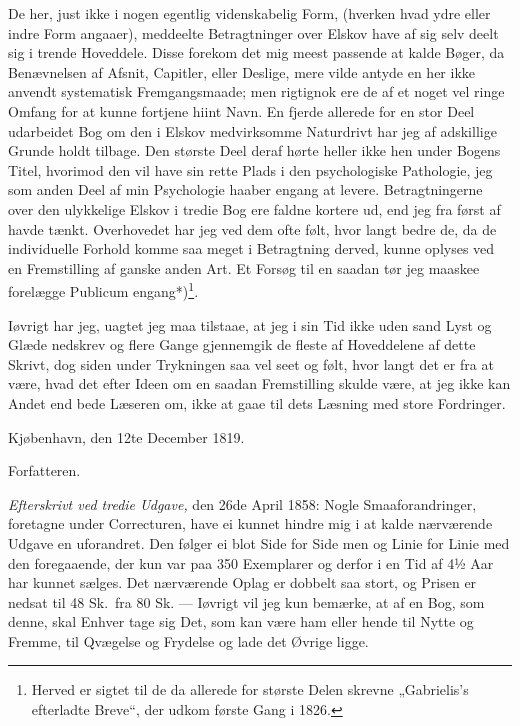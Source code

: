 \documentclass[12pt,a4paper]{book}
\newcommand{\opage}[1]{\marginnote{\footnotesize\textit{[#1]}}}
\begin{document}
De her, just ikke i nogen egentlig videnskabelig Form, (hverken hvad
ydre eller indre Form angaaer), meddeelte Betragtninger over Elskov
have af sig selv deelt sig i trende Hoveddele. Disse forekom det mig
meest passende at kalde Bøger, da Benævnelsen af Afsnit, Capitler,
eller Deslige, mere vilde antyde en her ikke anvendt systematisk
Fremgangsmaade; men rigtignok ere de af et noget vel ringe Omfang for
at kunne fortjene hiint Navn. En fjerde allerede for en stor Deel
udarbeidet Bog om den i Elskov medvirksomme Naturdrivt har jeg af
adskillige Grunde holdt tilbage. Den største Deel deraf hørte heller
ikke hen under Bogens Titel, hvorimod den vil have sin rette Plads i
den psychologiske Pathologie, jeg som anden Deel af min Psychologie
haaber engang at levere. Betragtningerne over den ulykkelige Elskov i
tredie Bog ere faldne kortere ud, end jeg fra først af havde tænkt.
Overhovedet har jeg ved dem ofte følt, hvor langt bedre de, da de
individuelle Forhold komme saa meget i Betragtning derved, kunne
oplyses ved en Fremstilling af ganske anden Art. Et Forsøg til en
saadan tør jeg maaskee forelægge Publicum engang*)\footnote{Herved er
sigtet til de da allerede for største Delen skrevne „Gabrielis's
efterladte Breve“, der udkom første Gang i 1826.}.

\opage{VIII} Iøvrigt har jeg, uagtet jeg maa tilstaae, at jeg i sin Tid ikke uden
sand Lyst og Glæde nedskrev og flere Gange gjennemgik de fleste af
Hoveddelene af dette Skrivt, dog siden under Trykningen saa vel seet og
følt, hvor langt det er fra at være, hvad det efter Ideen om en saadan
Fremstilling skulde være, at jeg ikke kan Andet end bede Læseren om,
ikke at gaae til dets Læsning med store Fordringer.

\noindent Kjøbenhavn, den 12te December 1819.
\begin{flushright}
Forfatteren.
\end{flushright}

\bigskip
\noindent\textit{Efterskrivt ved tredie Udgave,} den 26de April 1858:
Nogle Smaaforandringer, foretagne under Correcturen, have ei kunnet
hindre mig i at kalde nærværende Udgave en uforandret. Den følger ei
blot Side for Side men og Linie for Linie med den foregaaende, der kun
var paa 350 Exemplarer og derfor i en Tid af 4½ Aar har kunnet sælges.
Det nærværende Oplag er dobbelt saa stort, og Prisen er nedsat til 48
Sk.\ fra 80 Sk. --- Iøvrigt vil jeg kun bemærke, at af en Bog, som
denne, skal Enhver tage sig Det, som kan være ham eller hende til Nytte
og Fremme, til Qvægelse og Frydelse og lade det Øvrige ligge.
\end{document}
